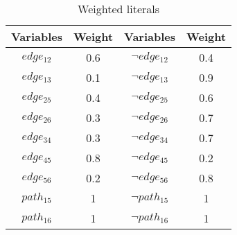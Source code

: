 \begin{table}[H]
    \centering
    \caption{Weighted literals}
    \label{table:12weight}
    \begin{tabular}{c|c||c|c}
        \hline
        Variables & Weight & Variables & Weight \\ \hline
        $edge_{12}$ & 0.6 & $\neg edge_{12}$ & 0.4 \\
        $edge_{13}$ & 0.1 & $\neg edge_{13}$ & 0.9 \\
        $edge_{25}$ & 0.4 & $\neg edge_{25}$ & 0.6 \\
        $edge_{26}$ & 0.3 & $\neg edge_{26}$ & 0.7 \\
        $edge_{34}$ & 0.3 & $\neg edge_{34}$ & 0.7 \\
        $edge_{45}$ & 0.8 & $\neg edge_{45}$ & 0.2 \\
        $edge_{56}$ & 0.2 & $\neg edge_{56}$ & 0.8 \\
        $path_{15}$ & 1 & $\neg path_{15}$ & 1 \\
        $path_{16}$ & 1 & $\neg path_{16}$ & 1
    \end{tabular}
\end{table}